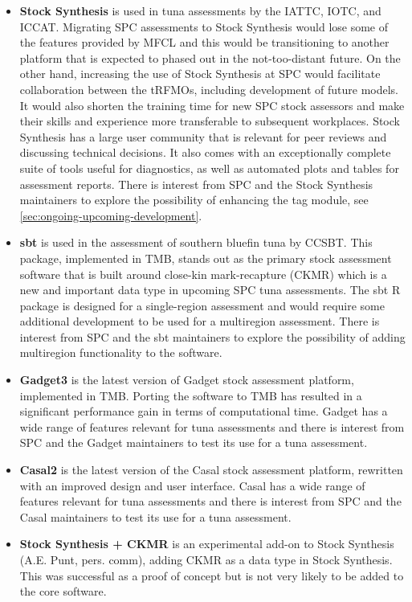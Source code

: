 \documentclass{SCreport}
\begin{document}
\begin{itemize}
  \item \textbf{Stock Synthesis} is used in tuna assessments by the IATTC, IOTC,
  and ICCAT. Migrating SPC assessments to Stock Synthesis would lose some of the
  features provided by MFCL and this would be transitioning to another platform
  that is expected to phased out in the \mbox{not-too-distant} future. On the
  other hand, increasing the use of Stock Synthesis at SPC would facilitate
  collaboration between the tRFMOs, including development of future models. It
  would also shorten the training time for new SPC stock assessors and make
  their skills and experience more transferable to subsequent workplaces. Stock
  Synthesis has a large user community that is relevant for peer reviews and
  discussing technical decisions. It also comes with an exceptionally complete
  suite of tools useful for diagnostics, as well as automated plots and tables
  for assessment reports. There is interest from SPC and the Stock Synthesis
  maintainers to explore the possibility of enhancing the tag module, see
  \autoref{sec:ongoing-upcoming-development}.
  \item \textbf{sbt} is used in the assessment of southern bluefin tuna by
  CCSBT. This package, implemented in TMB, stands out as the primary stock
  assessment software that is built around close-kin mark-recapture (CKMR) which
  is a new and important data type in upcoming SPC tuna assessments. The
  \textsf{sbt} R package is designed for a single-region assessment and would
  require some additional development to be used for a multiregion assessment.
  There is interest from SPC and the \textsf{sbt} maintainers to explore the
  possibility of adding multiregion functionality to the software.
  \item \textbf{Gadget3} is the latest version of Gadget stock assessment
  platform, implemented in TMB. Porting the software to TMB has resulted in a
  significant performance gain in terms of computational time. Gadget has a wide
  range of features relevant for tuna assessments and there is interest from SPC
  and the Gadget maintainers to test its use for a tuna assessment.
  \item \textbf{Casal2} is the latest version of the Casal stock assessment
  platform, rewritten with an improved design and user interface. Casal has a
  wide range of features relevant for tuna assessments and there is interest
  from SPC and the Casal maintainers to test its use for a tuna assessment.
  \item \textbf{Stock Synthesis + CKMR} is an experimental add-on to Stock
  Synthesis (A.E. Punt, pers. comm), adding CKMR as a data type in Stock
  Synthesis. This was successful as a proof of concept but is not very likely to
  be added to the core software.
\end{itemize}
\end{document}
